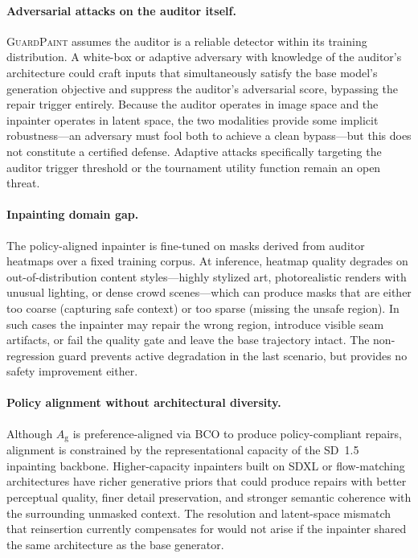 \documentclass[11pt]{article}
\newcommand{\Ag}{A_{\mathrm{g}}}
\begin{document}
\paragraph{Adversarial attacks on the auditor itself.}
\textsc{GuardPaint} assumes the auditor is a reliable detector within its
training distribution. A white-box or adaptive adversary with knowledge of
the auditor's architecture could craft inputs that simultaneously satisfy the
base model's generation objective and suppress the auditor's adversarial
score, bypassing the repair trigger entirely. Because the auditor operates in
image space and the inpainter operates in latent space, the two modalities
provide some implicit robustness---an adversary must fool both to achieve a
clean bypass---but this does not constitute a certified defense. Adaptive
attacks specifically targeting the auditor trigger threshold or the tournament
utility function remain an open threat.

\paragraph{Inpainting domain gap.}
The policy-aligned inpainter is fine-tuned on masks derived from auditor
heatmaps over a fixed training corpus. At inference, heatmap quality degrades
on out-of-distribution content styles---highly stylized art, photorealistic
renders with unusual lighting, or dense crowd scenes---which can produce
masks that are either too coarse (capturing safe context) or too sparse
(missing the unsafe region). In such cases the inpainter may repair the wrong
region, introduce visible seam artifacts, or fail the quality gate and leave
the base trajectory intact. The non-regression guard prevents active
degradation in the last scenario, but provides no safety improvement either.

\paragraph{Policy alignment without architectural diversity.}
Although $\Ag$ is preference-aligned via BCO to produce policy-compliant
repairs, alignment is constrained by the representational capacity of the
SD~1.5 inpainting backbone. Higher-capacity inpainters built on SDXL or
flow-matching architectures have richer generative priors that could
produce repairs with better perceptual quality, finer detail preservation,
and stronger semantic coherence with the surrounding unmasked context.
The resolution and latent-space mismatch that reinsertion currently
compensates for would not arise if the inpainter shared the same
architecture as the base generator.
\end{document}
